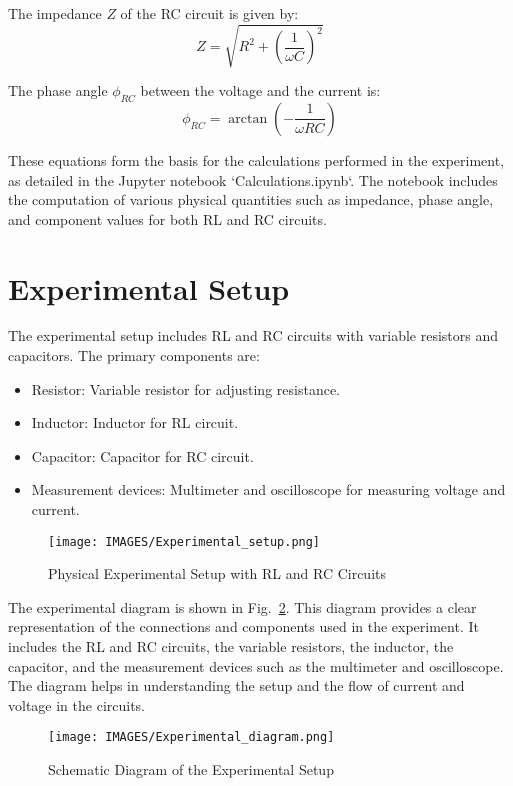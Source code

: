 \documentclass[journal]{IEEEtran}
\begin{document}
The impedance \(Z\) of the RC circuit is given by:
\begin{equation}
    Z = \sqrt{R^2 + \left(\frac{1}{\omega C}\right)^2} \label{eq:rc_impedance}
\end{equation}

The phase angle \(\phi_{RC}\) between the voltage and the current is:
\begin{equation}
    \phi_{RC} = \arctan\left(-\frac{1}{\omega RC}\right) \label{eq:rc_phase}
\end{equation}

These equations form the basis for the calculations performed in the experiment, as detailed in the Jupyter notebook `Calculations.ipynb`. The notebook includes the computation of various physical quantities such as impedance, phase angle, and component values for both RL and RC circuits.

\section{Experimental Setup}
The experimental setup includes RL and RC circuits with variable resistors and capacitors. The primary components are:
\begin{itemize}
    \item Resistor: Variable resistor for adjusting resistance.
    \item Inductor: Inductor for RL circuit.
    \item Capacitor: Capacitor for RC circuit.
    \item Measurement devices: Multimeter and oscilloscope for measuring voltage and current.
\end{itemize}

\begin{figure}[H]
    \centering
    \texttt{[image: IMAGES/Experimental\_setup.png]}
    \caption{Physical Experimental Setup with RL and RC Circuits}
    \label{fig:exp_setup}
\end{figure}
The experimental diagram is shown in Fig.~\ref{fig:exp_diagram}. This diagram provides a clear representation of the connections and components used in the experiment. It includes the RL and RC circuits, the variable resistors, the inductor, the capacitor, and the measurement devices such as the multimeter and oscilloscope. The diagram helps in understanding the setup and the flow of current and voltage in the circuits.
\begin{figure}[H]
    \centering
    \texttt{[image: IMAGES/Experimental\_diagram.png]}
    \caption{Schematic Diagram of the Experimental Setup}
    \label{fig:exp_diagram}
\end{figure}
\end{document}
